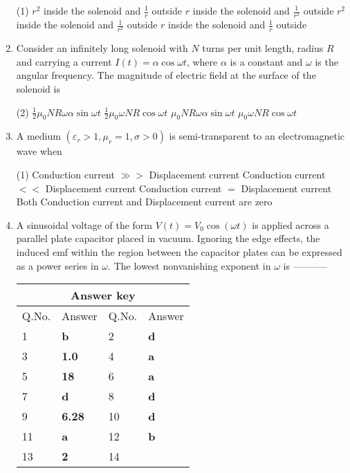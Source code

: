 \begin{enumerate}
{}
 \begin{tasks}(1)
	\task[\textbf{a.}] $r^{2}$ inside the solenoid and $\frac{1}{r}$ outside
	\task[\textbf{b.}]$r$ inside the solenoid and $\frac{1}{r^{2}}$ outside
	\task[\textbf{c.}]$r^{2}$ inside the solenoid and $\frac{1}{r^{2}}$ outside
	\task[\textbf{d.}] $r$ inside the solenoid and $\frac{1}{r}$ outside
\end{tasks}
\item Consider an infinitely long solenoid with $N$ turns per unit length, radius $R$ and carrying a current $I(t)=\alpha \cos \omega t$, where $\alpha$ is a constant and $\omega$ is the angular frequency. The magnitude of electric field at the surface of the solenoid is
 \begin{tasks}(2)
	\task[\textbf{a.}]$\frac{1}{2} \mu_{0} N R \omega \alpha \sin \omega t$
	\task[\textbf{b.}]$\frac{1}{2} \mu_{0} \omega N R \cos \omega t$
	\task[\textbf{c.}]$\mu_{0} N R \omega \alpha \sin \omega t$
	\task[\textbf{d.}] $\mu_{0} \omega N R \cos \omega t$
\end{tasks}
\item A medium $\left(\varepsilon_{r}>1, \mu_{r}=1, \sigma>0\right)$ is semi-transparent to an electromagnetic wave when
{}
 \begin{tasks}(1)
	\task[\textbf{a.}]Conduction current $\gg>$ Displacement current
	\task[\textbf{b.}]Conduction current $<<$ Displacement current
	\task[\textbf{c.}]Conduction current $=$ Displacement current
	\task[\textbf{d.}] Both Conduction current and Displacement current are zero
\end{tasks}
\item A sinusoidal voltage of the form $V(t)=V_{0} \cos (\omega t)$ is applied across a parallel plate capacitor placed in vacuum. Ignoring the edge effects, the induced emf within the region between the capacitor plates can be expressed as a power series in $\omega$. The lowest nonvanishing exponent in $\omega$ is -----------
{}
\setlength\arrayrulewidth{1pt}
\begin{table}[H]
	\centering
	\begin{tabular}{|p{1.5cm}|p{1.5cm}||p{1.5cm}|p{1.5cm}|}
		\hline
		\multicolumn{4}{|c|}{\textbf{Answer key}}\\\hline\hline
		\rowcolor{ocrel}Q.No.&Answer&Q.No.&Answer\\\hline
		1&\textbf{b} &2&\textbf{d}\\\hline 
		3&\textbf{1.0} &4&\textbf{a} \\\hline
		5&\textbf{18} &6&\textbf{a} \\\hline
		7&\textbf{d}&8&\textbf{d}\\\hline
		9&\textbf{6.28}&10&\textbf{d}\\\hline
		11&\textbf{a} &12&\textbf{b}\\\hline
		13&\textbf{2}&14&\textbf{}\\\hline
		
	\end{tabular}
\end{table}
\end{enumerate}
